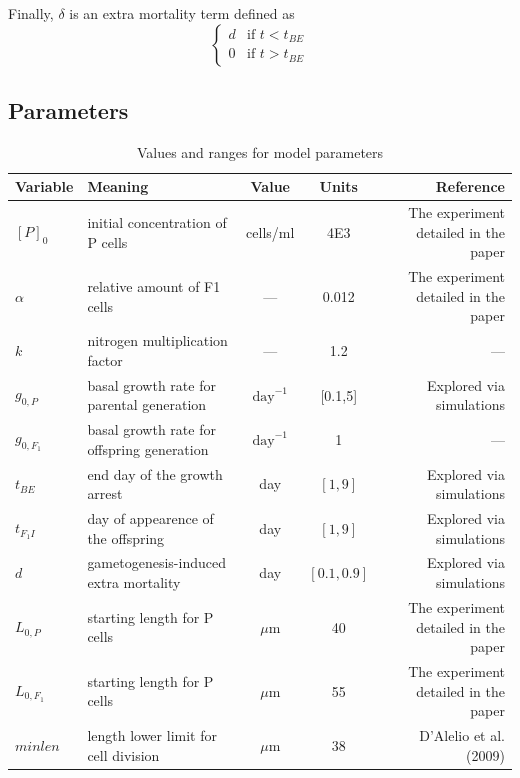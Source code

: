 \documentclass[a4paper,oneside]{book}
\begin{document}
    Finally, $\delta$ is an extra mortality term defined as
    \[
      \begin{cases}
        d & \mbox{if } t < t_{BE} \\
        0 & \mbox{if } t > t_{BE}
      \end{cases}
    \]
    
    \subsection*{Parameters}
      \begin{table}
        \caption{Values and ranges for model parameters}\label{tbl1}
         \begin{tabular}{@{}llccr@{}}
          \toprule
            \textbf{Variable}&\textbf{Meaning} & \textbf{Value} & \textbf{Units} & \textbf{Reference}\\
          \midrule
            ${[P]}_{0}$     & initial concentration of P cells           & cells/ml          & 4E3           & The experiment detailed in the paper\\
            $\alpha$        & relative amount of F1 cells                & ---               & 0.012         & The experiment detailed in the paper\\
            $k$             & nitrogen multiplication factor             & ---               & 1.2           & ---\\
            $g_{0, P}$      & basal growth rate for parental generation  & $\text{day}^{-1}$ & {[0.1,5]}     & Explored via simulations\\
            $g_{0, F_{1}}$  & basal growth rate for offspring generation & $\text{day}^{-1}$ & 1             & ---\\
            $t_{BE}$        & end day of the growth arrest               & day               & ${[1,9]}$     & Explored via simulations\\
            $t_{F_{1}I}$    & day of appearence of the offspring         & day               & ${[1,9]}$     & Explored via simulations\\
            $d$             & gametogenesis-induced extra mortality      & day               & ${[0.1,0.9]}$ & Explored via simulations\\
            $L_{0,P}$       & starting length for P cells                &$\mu$m             & 40            & The experiment detailed in the paper\\
            $L_{0,{F_{1}}}$ & starting length for P cells                &$\mu$m             & 55            & The experiment detailed in the paper\\
            $minlen$        & length lower limit for cell division       &$\mu$m             & 38            & D'Alelio et al. (2009)\\
          \bottomrule
        \end{tabular}
      \end{table}
%
\end{document}

